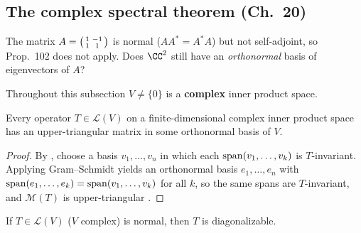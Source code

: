 \documentclass[10pt]{scrartcl}
\newcommand{\LL}{\mathcal L}\newcommand{\PP}{\mathcal P}\newcommand{\MM}{\mathcal M}
\begin{document}
\subsection{The complex spectral theorem (Ch.~20)}

\begin{qbox}
  The matrix $A=\begin{psmallmatrix}1&-1\\1&1\end{psmallmatrix}$ is normal ($AA^*=A^*A$) but not self-adjoint, so Prop.~102 does not apply. Does $\CC^2$ still have an \emph{orthonormal} basis of eigenvectors of $A$?
\end{qbox}

Throughout this subsection $V\neq\{0\}$ is a \textbf{complex} inner product space.

\begin{proposition*}
  Every operator $T\in\LL(V)$ on a finite-dimensional complex inner product space has an upper-triangular matrix in some orthonormal basis of $V$.
\end{proposition*}
\begin{proof}
  By , choose a basis $v_1,\dots,v_n$ in which each $\operatorname{span}(v_1,\dots,v_k)$ is $T$-invariant. Applying Gram--Schmidt  yields an orthonormal basis $e_1,\dots,e_n$ with $\operatorname{span}(e_1,\dots,e_k)=\operatorname{span}(v_1,\dots,v_k)$ for all $k$, so the same spans are $T$-invariant, and $\MM(T)$ is upper-triangular .
\end{proof}

\begin{theorem*}
  If $T\in\LL(V)$ ($V$ complex) is normal, then $T$ is diagonalizable.
\end{theorem*}
\end{document}
